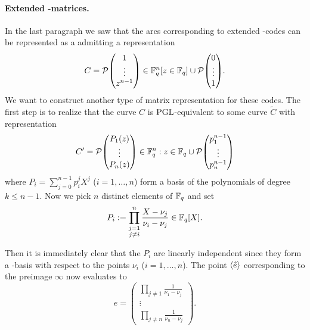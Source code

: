 \paragraph{Extended -matrices.}%
%
In the last paragraph we saw that the arcs corresponding to extended -codes can be represented as a  admitting a representation
$$ C = \set{\begin{pmatrix} 1 \\
            \vdots            \\
            z^{n-1}\end{pmatrix}\in\field{q}^n}[z\in \field{q}]\setjoin
    \set{\begin{pmatrix} 0    \\
            \vdots            \\
            1\end{pmatrix}}\textrm{.} $$
We want to construct another type of matrix representation for these codes.
The first step is to realize that the curve $C$ is $\mathrm{PGL}$-equivalent to some curve $\tilde{C}$ with representation
$$ C' = \set{
    \begin{pmatrix} P_1(z)             \\
        \vdots                         \\
        P_n(z)\end{pmatrix}\in\field{q}^n:z\in \field{q}}
\setjoin\set{\begin{pmatrix} p_1^{n-1} \\
        \vdots                         \\
        p_n^{n-1}\end{pmatrix}} $$
where $P_i=\sum_{j=0}^{n-1}{p_i^j X^j}$ ($i=1,\ldots,n$) form a basis of the polynomials of degree $k\leq n-1$. Now we pick $n$ distinct elements of $\mathbb{F}_{q}$ and set
$$ P_i := \prod_{\substack{j=1\\ j\neq i}}^n{\frac{X-\nu_j}{\nu_i-\nu_j}}\in\mathbb{F}_{q}[X]\textrm{.} $$

Then it is immediately clear that the $P_i$ are linearly independent since they form a -basis with respect to the points $\nu_i$ ($i=1,\ldots,n$). The point $\gen{\hat{e}}$ corresponding to the preimage $\infty$ now evaluates to
$$ e = 
    \begin{pmatrix}
        \prod\limits_{j\neq 1}{\frac{1}{\nu_1-\nu_j}}\\
        \vdots               \\
        \prod\limits_{j\neq n}{\frac{1}{\nu_n-\nu_j}}
    \end{pmatrix}\textrm{.} $$

